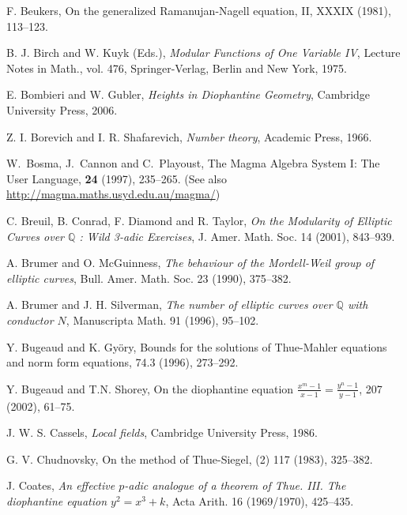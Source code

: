 \begin{thebibliography}{}
F. Beukers,
\newblock On the generalized Ramanujan-Nagell equation, II,
 XXXIX (1981), 113--123.

B. J. Birch and W. Kuyk (Eds.),
\emph{Modular Functions of One Variable IV},
Lecture Notes in Math., vol. 476, Springer-Verlag, Berlin and New York, 1975.

E. Bombieri and W. Gubler,
\emph{Heights in Diophantine Geometry}, 
Cambridge University Press, 2006.

Z. I. Borevich and I. R. Shafarevich, \emph{Number theory},
Academic Press, 1966.

W.\ Bosma, J.\ Cannon and C.\ Playoust,
\newblock The Magma Algebra System I: The User Language,
 {\bf 24} (1997), 235--265. (See also \url{http://magma.maths.usyd.edu.au/magma/})

C. Breuil, B. Conrad, F. Diamond and R. Taylor,
\emph{On the Modularity of Elliptic Curves over $\mathbb{Q}$ : Wild 3-adic Exercises},
J. Amer. Math. Soc. 14 (2001), 843--939.

A. Brumer and O. McGuinness,
\emph{The behaviour of the Mordell-Weil group of elliptic curves},
Bull. Amer. Math. Soc. 23 (1990), 375--382.

A. Brumer and J. H. Silverman,
\emph{The number of elliptic curves over $\mathbb{Q}$ with conductor $N$},
Manuscripta Math. 91 (1996), 95--102.

Y. Bugeaud and K. Gy\"{o}ry, 
\newblock Bounds for the solutions of Thue-Mahler equations and norm form equations, 
 74.3 (1996), 273--292.

Y. Bugeaud and T.N. Shorey,
\newblock On the diophantine equation $\frac{x^m-1}{x-1} = \frac{y^n-1}{y-1}$,
  207 (2002), 61--75.

J. W. S. Cassels, \emph{Local fields},
Cambridge University Press, 1986.

G. V. Chudnovsky, 
\newblock On the method of Thue-Siegel, 
 (2) 117 (1983), 325--382. 

J. Coates,
\emph{An effective $p$-adic analogue of a theorem of Thue. III. The diophantine equation $y^2=x^3+k$},
Acta Arith. 16 (1969/1970), 425--435.



\end{thebibliography}
